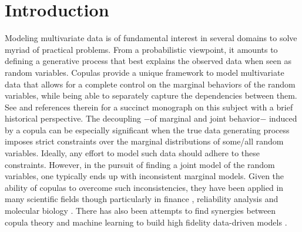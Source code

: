 \documentclass{article}
\begin{document}
\begin{abstract}

\end{abstract}

 


 


\section{Introduction}\label{sec:Intro}

Modeling multivariate data is of fundamental interest in several domains to solve myriad of practical problems. From a probabilistic viewpoint, it amounts to defining a generative process that best explains the observed data when seen as random variables. Copulas provide a unique framework to model multivariate data that allows for a complete control on the marginal behaviors of the random variables, while being able to separately capture the dependencies between them. See \citep{Durante2010CopulaIntro} and references therein for a succinct monograph on this subject with a brief historical perspective.  The decoupling $-$of marginal and joint behavior$-$ induced by a copula can be especially significant when the true data generating process imposes strict constraints over the marginal distributions of some/all random variables. Ideally, any effort to model such data should adhere to these constraints. However, in the pursuit of finding a joint model of the random variables, one typically ends up with inconsistent marginal models.  Given the ability of copulas to overcome such inconsistencies, they have been applied in many scientific fields though particularly in finance \citep{Genest2009CopulaInFinance,Cherubini2004copula}, reliability analysis \citep{Rychlik2010Reliability} and molecular biology \citep{Bilgrau2012quantification,Li2011,Kim2008,Ma2012Gini}.  There has also been  attempts to find synergies between copula theory and machine learning to build high fidelity data-driven models \citep[see][for a survey on the applications of copulas in machine learning approaches]{Elidan2013}.
\end{document}
